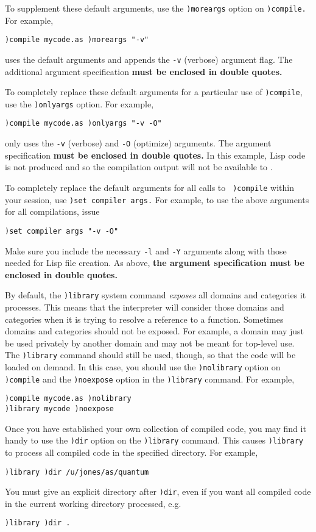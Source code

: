 To supplement these default arguments, use the {\tt )moreargs} option on
{\tt )compile.}
For example,
\begin{verbatim}
)compile mycode.as )moreargs "-v"
\end{verbatim}
uses the default arguments and appends the {\tt -v} (verbose)
argument flag.
The additional argument specification {\bf must be enclosed in
double quotes.}

To completely replace these default arguments for a particular
use of {\tt )compile}, use the {\tt )onlyargs} option.
For example,
\begin{verbatim}
)compile mycode.as )onlyargs "-v -O"
\end{verbatim}
only uses the {\tt -v} (verbose) and {\tt -O} (optimize)
arguments.
The argument specification {\bf must be enclosed in double quotes.}
In this example, Lisp code is not produced and so the compilation
output will not be available to \Language{}.

To completely replace the default arguments for all calls to {\tt
)compile} within your \Language{} session, use {\tt )set compiler args.}
For example, to use the above arguments for all compilations, issue
\begin{verbatim}
)set compiler args "-v -O"
\end{verbatim}
Make sure you include the necessary {\tt -l} and {\tt -Y}
arguments along with those needed for Lisp file creation.
As above, {\bf the argument specification must be enclosed in double
quotes.}

By default, the {\tt )library} system command {\it exposes} all
domains and categories it processes.
This means that the \Language{} interpreter will consider those
domains and categories when it is trying to resolve a reference
to a function.
Sometimes domains and categories should not be exposed.
For example, a domain may just be used privately by another
domain and may not be meant for top-level use.
The {\tt )library} command should still be used, though, so that
the code will be loaded on demand.
In this case, you should use the {\tt )nolibrary} option on {\tt
)compile} and the {\tt )noexpose} option in the {\tt )library}
command. For example,
\begin{verbatim}
)compile mycode.as )nolibrary
)library mycode )noexpose
\end{verbatim}

Once you have established your own collection of compiled code,
you may find it handy to use the {\tt )dir} option on the
{\tt )library} command.
This causes {\tt )library} to process all compiled code in the
specified directory. For example,
\begin{verbatim}
)library )dir /u/jones/as/quantum
\end{verbatim}
You must give an explicit directory after {\tt )dir}, even if you
want all compiled code in the current working directory
processed, e.g.
\begin{verbatim}
)library )dir .
\end{verbatim}


